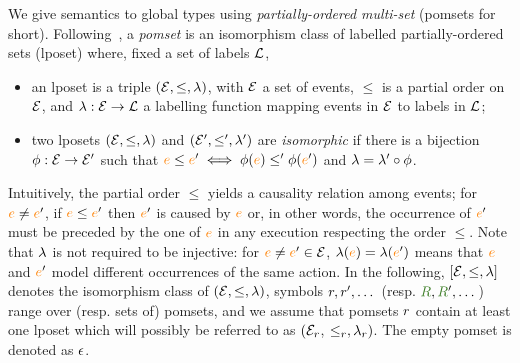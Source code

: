 We give semantics to global types using \emph{partially-ordered
  multi-set} (pomsets for short).
%
Following~\cite{gaifman1987partial}, a \emph{pomset} is an isomorphism
class of labelled partially-ordered sets (lposet) where, fixed a set
of labels $\mathcal{L}$,
\begin{itemize}
\item an lposet is a triple $(\mathcal{E}, \leq, \lambda)$, with $\mathcal{E}$ a set
  of events, $\leq$ is a partial order on $\mathcal{E}$, and
  $\lambda: \mathcal{E} \rightarrow \mathcal{L}$ a labelling function mapping events
  in $\mathcal{E}$ to labels in $\mathcal{L}$;
\item two lposets $(\mathcal{E}, \leq, \lambda)$ and $(\mathcal{E}', \leq', \lambda')$
  are \emph{isomorphic} if there is a bijection
  $\phi: \mathcal{E} \rightarrow \mathcal{E}'$ such that
  ${\color{orange}{e}} \leq {\color{orange}{e}}' \iff \phi({\color{orange}{e}}) \leq' \phi({\color{orange}{e}}')$ and
  $\lambda = \lambda' \circ \phi$.
\end{itemize}
%
Intuitively, the partial order $\leq$ yields a causality relation
among events; for ${\color{orange}{e}} \neq {\color{orange}{e}}'$, if ${\color{orange}{e}} \leq {\color{orange}{e}}'$ then ${\color{orange}{e}}'$ is
caused by ${\color{orange}{e}}$ or, in other words, the occurrence of ${\color{orange}{e}}'$ must be
preceded by the one of ${\color{orange}{e}}$ in any execution respecting the order
$\leq$.
%
Note that $\lambda$ is not required to be injective: for
${\color{orange}{e}} \neq {\color{orange}{e}}' \in \mathcal{E}$, $\lambda({\color{orange}{e}}) = \lambda({\color{orange}{e}}')$ means that ${\color{orange}{e}}$
and ${\color{orange}{e}}'$ model different occurrences of the same action.
%
In the following, $[\mathcal{E}, \leq, \lambda]$ denotes the isomorphism class
of $(\mathcal{E}, \leq, \lambda)$, symbols $r,r', \dots$ (resp.
$\aR, \aR', \dots$) range over (resp. sets of) pomsets, and we assume
that pomsets $r$ contain at least one lposet which will possibly
be referred to as $(\mathcal{E}_{r}$, $\leq_{r}, \lambda_{r})$.
%
The empty pomset is denoted as $\epsilon$.

